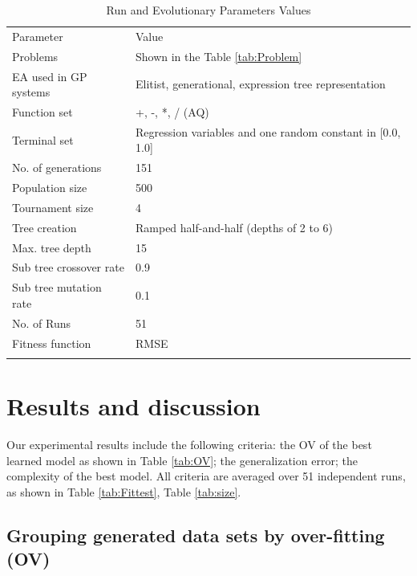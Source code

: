 \begin{table}
\caption{Run and Evolutionary Parameters Values}
\label{tab:Parameter}       %
\begin{tabular}{ll}
\hline\noalign{\smallskip}
Parameter & Value \\
\noalign{\smallskip}\hline\noalign{\smallskip}
Problems &	Shown in the Table \ref{tab:Problem}  \\
EA used in GP systems &	Elitist, generational, expression tree representation \\
Function set &	+, -, *, / (AQ) \\
Terminal set &	Regression variables and one random constant in [0.0, 1.0] \\
No. of generations	& 151 \\
Population size	& 500 \\
Tournament size &	4 \\
Tree creation	& Ramped half-and-half (depths of 2 to 6) \\
Max. tree depth	& 15 \\
Sub tree crossover rate	& 0.9 \\
Sub tree mutation rate & 0.1 \\
No.  of Runs & 51 \\
Fitness function & RMSE \\
\noalign{\smallskip}\hline
\end{tabular}
\end{table}

\section {Results and discussion}
\label{Res}

Our experimental results include the following criteria: the OV of the best learned model as shown in Table \ref{tab:OV}; the generalization error; the complexity of the best model. All criteria are averaged over 51 independent runs, as shown in Table \ref{tab:Fittest}, Table \ref{tab:size}.


\subsection {Grouping generated data sets by over-fitting (OV)}
\label{Gro}

